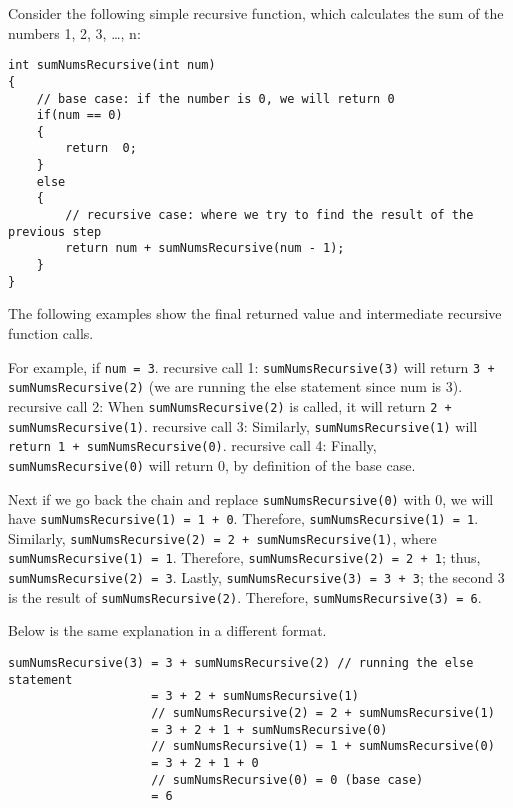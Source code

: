 Consider the following simple recursive function, which calculates the sum of the numbers 1, 2, 3, …, n:

\begin{verbatim}
int sumNumsRecursive(int num)
{
    // base case: if the number is 0, we will return 0
    if(num == 0)
    {
        return  0;
    }
    else
    {
        // recursive case: where we try to find the result of the previous step
        return num + sumNumsRecursive(num - 1);
    }
}
\end{verbatim}

The following examples show the final returned value and intermediate recursive function calls.

For example, if \texttt{num = 3}.
recursive call 1: \texttt{sumNumsRecursive(3)} will return \texttt{3 + sumNumsRecursive(2)} (we are running the else statement since num is 3).
recursive call 2: When \texttt{sumNumsRecursive(2)} is called, it will return \texttt{2 + sumNumsRecursive(1)}.
recursive call 3: Similarly, \texttt{sumNumsRecursive(1)} will \texttt{return 1 + sumNumsRecursive(0)}.
recursive call 4: Finally, \texttt{sumNumsRecursive(0)} will return 0, by definition of the base case.

Next if we go back the chain and replace \texttt{sumNumsRecursive(0)} with 0, we will have \texttt{sumNumsRecursive(1) = 1 + 0}. Therefore, \texttt{sumNumsRecursive(1) = 1}.
Similarly, \texttt{sumNumsRecursive(2) = 2 + sumNumsRecursive(1)}, where \texttt{sumNumsRecursive(1) = 1}. Therefore, \texttt{sumNumsRecursive(2) = 2 + 1}; thus, \texttt{sumNumsRecursive(2) = 3}.
Lastly, \texttt{sumNumsRecursive(3) = 3 + 3}; the second 3 is the result of \texttt{sumNumsRecursive(2)}. Therefore, \texttt{sumNumsRecursive(3) = 6}.

Below is the same explanation in a different format.

\begin{verbatim}
sumNumsRecursive(3) = 3 + sumNumsRecursive(2) // running the else statement
                    = 3 + 2 + sumNumsRecursive(1) 
                    // sumNumsRecursive(2) = 2 + sumNumsRecursive(1)
                    = 3 + 2 + 1 + sumNumsRecursive(0) 
                    // sumNumsRecursive(1) = 1 + sumNumsRecursive(0)
                    = 3 + 2 + 1 + 0 
                    // sumNumsRecursive(0) = 0 (base case)
                    = 6
\end{verbatim}

